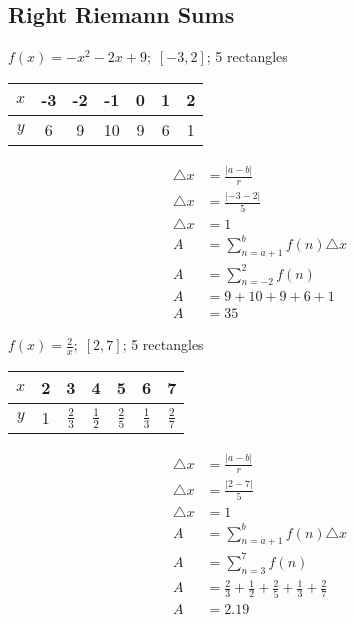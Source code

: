 \documentclass[12pt]{article}
\begin{document}
\subsection*{Right Riemann Sums}
\begin{multicols}{2}

$f(x)=-x^2-2x+9; \; [-3,2]$; 5 rectangles

\begin{center}
    \begin{tabular}{ c|c|c|c|c|c|c }
        $x$ & -3 & -2 & -1 & 0 & 1 & 2 \\
        \hline
        $y$ & 6 & 9 & 10 & 9 & 6 & 1\\
    \end{tabular}
    \begin{align*}
        \triangle x &= \frac{|a-b|}{r} \\
        \triangle x &= \frac{|-3-2|}{5} \\
        \triangle x &= 1 \\
        A &= \sum_{n=a+1}^{b} f(n)\triangle x \\ 
        A &= \sum_{n=-2}^2 f(n) \\
        A &= 9 + 10 + 9 + 6 + 1 \\
        A &= 35
    \end{align*}
\end{center}

\columnbreak 
$f(x)=\frac{2}{x}; \; [2,7]$; 5 rectangles

\begin{center}
    \begin{tabular}{ c|c|c|c|c|c|c }
        $x$ & 2 & 3 & 4 & 5 & 6 & 7 \\
        \hline
        $y$ & 1 & $\frac{2}{3}$ & $\frac{1}{2}$ & $\frac{2}{5}$ & $\frac{1}{3}$ & $\frac{2}{7}$ \\
    \end{tabular}
    \begin{align*}
        \triangle x &= \frac{|a-b|}{r} \\
        \triangle x &= \frac{|2-7|}{5} \\
        \triangle x &= 1 \\
        A &= \sum_{n=a+1}^{b} f(n)\triangle x \\ 
        A &= \sum_{n=3}^7 f(n) \\
        A &= \frac{2}{3} + \frac{1}{2} + \frac{2}{5} + \frac{1}{3} + \frac{2}{7} \\
        A &= 2.19
    \end{align*}
\end{center}

\end{multicols}
\newpage
\end{document}
